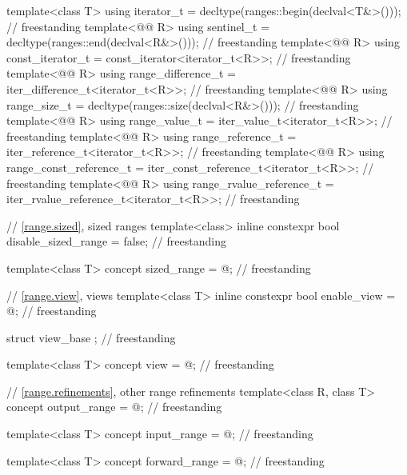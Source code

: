 \begin{codeblock}
{  template<class T>
    using iterator_t = decltype(ranges::begin(declval<T&>()));                      // freestanding
  template<@@ R>
    using sentinel_t = decltype(ranges::end(declval<R&>()));                        // freestanding
  template<@@ R>
    using const_iterator_t = const_iterator<iterator_t<R>>;                         // freestanding
  template<@@ R>
    using range_difference_t = iter_difference_t<iterator_t<R>>;                    // freestanding
  template<@@ R>
    using range_size_t = decltype(ranges::size(declval<R&>()));                     // freestanding
  template<@@ R>
    using range_value_t = iter_value_t<iterator_t<R>>;                              // freestanding
  template<@@ R>
    using range_reference_t = iter_reference_t<iterator_t<R>>;                      // freestanding
  template<@@ R>
    using range_const_reference_t = iter_const_reference_t<iterator_t<R>>;          // freestanding
  template<@@ R>
    using range_rvalue_reference_t = iter_rvalue_reference_t<iterator_t<R>>;        // freestanding

  // \ref{range.sized}, sized ranges
  template<class>
    inline constexpr bool disable_sized_range = false;                              // freestanding

  template<class T>
    concept sized_range = @\seebelow@;                                                // freestanding

  // \ref{range.view}, views
  template<class T>
    inline constexpr bool enable_view = @\seebelow@;                                  // freestanding

  struct view_base {};                                                              // freestanding

  template<class T>
    concept view = @\seebelow@;                                                       // freestanding

  // \ref{range.refinements}, other range refinements
  template<class R, class T>
    concept output_range = @\seebelow@;                                               // freestanding

  template<class T>
    concept input_range = @\seebelow@;                                                // freestanding

  template<class T>
    concept forward_range = @\seebelow@;                                              // freestanding

}
\end{codeblock}
